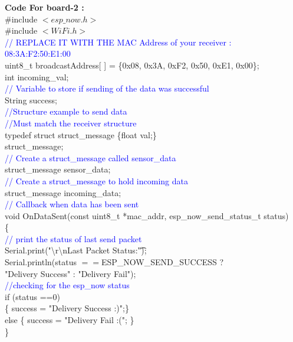 \documentclass[12pt,a4paper]{article}
\begin{document}
\vspace{5mm}
\textbf{\large Code For board-2 :}\\[6pt]

\#include $<esp\_now.h>$\\
\#include $<WiFi.h>$\\

\textcolor{blue}{// REPLACE IT WITH THE MAC Address of your receiver 
:\\08:3A:F2:50:E1:00}\\
uint8\_t broadcastAddress[ ] = \{0x08, 0x3A, 0xF2, 0x50, 0xE1, 0x00\};\\
int incoming\_val;\\
\textcolor{blue}{// Variable to store if sending of the data was successful}\\
String success;\\
\textcolor{blue}{//Structure example to send data}\\
\textcolor{blue}{//Must match the receiver structure}\\
typedef struct struct\_message \{float val;\}\\
struct\_message;\\
\textcolor{blue}{// Create a struct\_message called sensor\_data }\\
struct\_message sensor\_data;\\

\textcolor{blue}{// Create a struct\_message to hold incoming data}\\
struct\_message incoming\_data;\\

\textcolor{blue}{// Callback when data has been sent}\\
void OnDataSent(const uint8\_t *mac\_addr, esp\_now\_send\_status\_t status)\\
\{\\
\textcolor{blue}{// print the status of  last send packet }\\
  Serial.print("\textbackslash r\textbackslash nLast Packet Status:\t");\\
  Serial.println(status $== $ESP\_NOW\_SEND\_SUCCESS ?\\ "Delivery Success" : "Delivery Fail");\\ 
  \textcolor{blue}{//checking for the esp\_now status}\\
  if (status ==0)\\
  \{ success = "Delivery Success :)";\}\\
  else \{ success = "Delivery Fail :("; \}\\
\}\\
\end{document}
